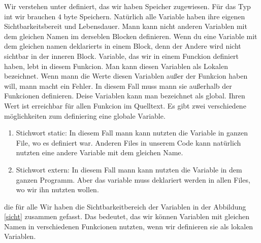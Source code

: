 \documentclass{article}[12pt]
\begin{document}
Wir verstehen unter definiert, das wir haben Speicher zugewiesen. Für das Typ int wir brauchen $4$ byte Speichern.
Natürlich alle Variable haben ihre eigenen Sichtbarkeitsbereit und Lebensdauer. Mann kann nicht anderen Variablen mit dem gleichen Namen 
im derseblen Blocken definieren. Wenn du eine Variable mit dem gleichen namen deklarierts in einem Block, denn der Andere wird nicht
sichtbar in der inneren Block. Variable, das wir in einem Funckion definiert haben, lebt in diesem Funkcion. Man kann diesen Variablen als 
Lokalen bezeichnet. Wenn mann die Werte diesen Variablen außer der Funkcion haben will, mann macht ein Fehler. In diesem Fall 
muss mann sie außerhalb der Funkcionen definieren. Deise Variablen kann man bezeichnet als global. 
Ihren Wert ist erreichbar für allen Funkcion im Quelltext. Es gibt zwei verschiedene möglichkeiten zum definiering
eine globale Variable.
\begin{enumerate}
\item Stichwort static: In diesem Fall mann kann nutzten die Variable in ganzen File, wo es definiert war. Anderen
Files in unserem Code kann natürlich nutzten eine andere Variable mit dem gleichen Name.
\item Stichwort extern: In diesem Fall mann kann nutzten die Variable in dem ganzen Programm. Aber das
variable muss deklariert werden in allen Files, wo wir ihn nutzten wollen.
\end{enumerate} die für alle
Wir haben die Sichtbarkeitbereich der Variablen 
in der Abbildung  \ref{sicht} zusammen gefasst.  Das bedeutet, das wir können Variablen mit 
gleichen Namen in verschiedenen Funkcionen nutzten, wenn wir definieren sie als lokalen Variablen. 
\end{document}
